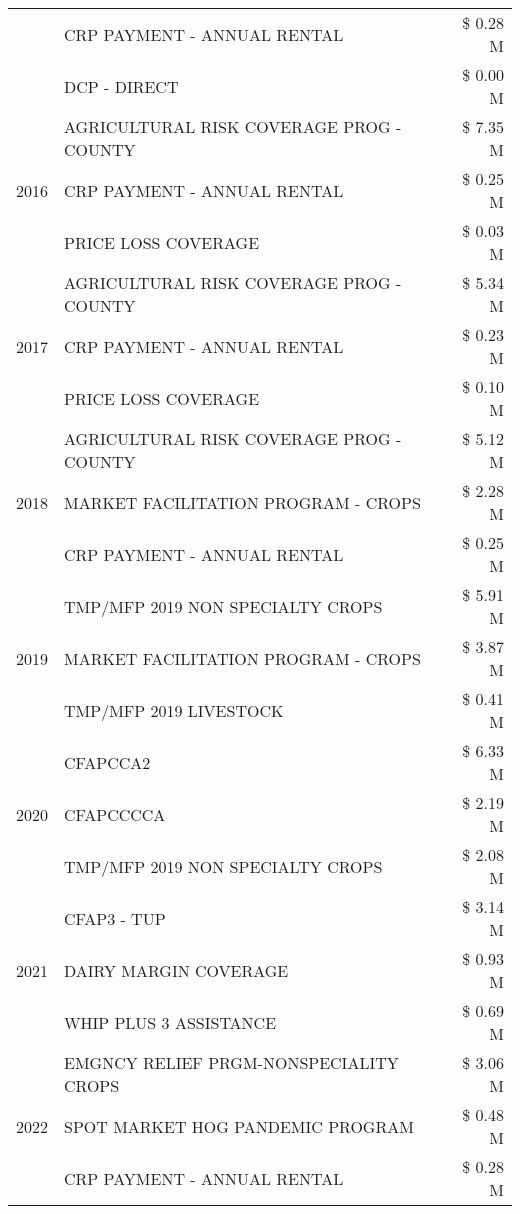 \begin{tabular}{llr}
 & CRP PAYMENT - ANNUAL RENTAL & \$ 0.28 M \\
 & DCP - DIRECT & \$ 0.00 M \\
\cline{1-3}
\multirow[t]{3}{*}{2016} & AGRICULTURAL RISK COVERAGE PROG - COUNTY & \$ 7.35 M \\
 & CRP PAYMENT - ANNUAL RENTAL & \$ 0.25 M \\
 & PRICE LOSS COVERAGE & \$ 0.03 M \\
\cline{1-3}
\multirow[t]{3}{*}{2017} & AGRICULTURAL RISK COVERAGE PROG - COUNTY & \$ 5.34 M \\
 & CRP PAYMENT - ANNUAL RENTAL & \$ 0.23 M \\
 & PRICE LOSS COVERAGE & \$ 0.10 M \\
\cline{1-3}
\multirow[t]{3}{*}{2018} & AGRICULTURAL RISK COVERAGE PROG - COUNTY & \$ 5.12 M \\
 & MARKET FACILITATION PROGRAM - CROPS & \$ 2.28 M \\
 & CRP PAYMENT - ANNUAL RENTAL & \$ 0.25 M \\
\cline{1-3}
\multirow[t]{3}{*}{2019} & TMP/MFP 2019 NON SPECIALTY CROPS & \$ 5.91 M \\
 & MARKET FACILITATION PROGRAM - CROPS & \$ 3.87 M \\
 & TMP/MFP 2019 LIVESTOCK & \$ 0.41 M \\
\cline{1-3}
\multirow[t]{3}{*}{2020} & CFAPCCA2 & \$ 6.33 M \\
 & CFAPCCCCA & \$ 2.19 M \\
 & TMP/MFP 2019 NON SPECIALTY CROPS & \$ 2.08 M \\
\cline{1-3}
\multirow[t]{3}{*}{2021} & CFAP3 - TUP & \$ 3.14 M \\
 & DAIRY MARGIN COVERAGE & \$ 0.93 M \\
 & WHIP PLUS 3 ASSISTANCE & \$ 0.69 M \\
\cline{1-3}
\multirow[t]{3}{*}{2022} & EMGNCY RELIEF PRGM-NONSPECIALITY CROPS & \$ 3.06 M \\
 & SPOT MARKET HOG PANDEMIC PROGRAM & \$ 0.48 M \\
 & CRP PAYMENT - ANNUAL RENTAL & \$ 0.28 M \\
\cline{1-3}
\bottomrule
\end{tabular}
